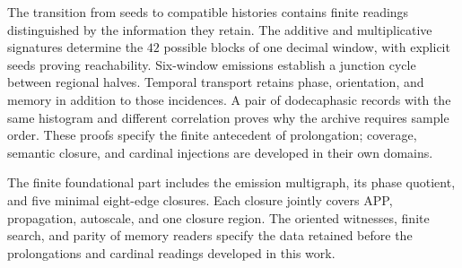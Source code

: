 The transition from seeds to compatible histories contains finite
readings distinguished by the information they retain. The additive and
multiplicative signatures determine the \(42\) possible blocks of one
decimal window, with explicit seeds proving reachability. Six-window
emissions establish a junction cycle between regional halves. Temporal
transport retains phase, orientation, and memory in addition to those
incidences. A pair of dodecaphasic records with the same histogram and
different correlation proves why the archive requires sample order.
These proofs specify the finite antecedent of prolongation; coverage,
semantic closure, and cardinal injections are developed in their own
domains.

The finite foundational part includes the emission multigraph, its
phase quotient, and five minimal eight-edge closures. Each closure
jointly covers APP, propagation, autoscale, and one closure region.
The oriented witnesses, finite search, and parity of memory readers
specify the data retained before the prolongations and cardinal
readings developed in this work.
